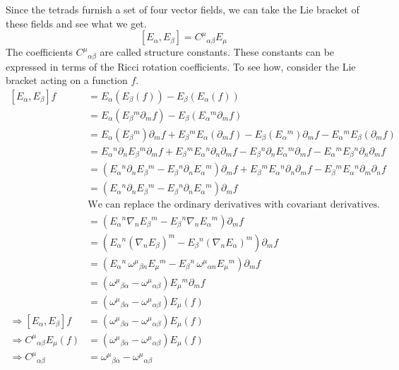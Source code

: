 Since the tetrads furnish a set of four vector fields, we can take the Lie bracket of these fields and see what we get.
\[
\left[ E_\alpha, E_\beta \right] = C^{\mu}{}_{\alpha\beta} E_\mu
\]
The coefficients $C^{\mu}{}_{\alpha\beta}$ are called structure constants. These constants can be expressed in terms of the Ricci rotation coefficients. To see how, consider the Lie bracket acting on a function $f$.
\begin{align*}
\left[ E_\alpha, E_\beta \right] f &= E_\alpha\left( E_\beta(f) \right) - E_\beta\left( E_\alpha(f) \right) \\
&= E_\alpha\left( E_\beta{}^m \partial_m f \right) - E_\beta\left( E_\alpha{}^m \partial_m f \right) \\
&= E_\alpha\left( E_\beta{}^m \right) \partial_m f + E_\beta{}^m E_\alpha\left( \partial_m f \right) - E_\beta\left( E_\alpha{}^m \right) \partial_m f - E_\alpha{}^m E_\beta\left( \partial_m f \right) \\
&= E_\alpha{}^n \partial_n E_\beta{}^m \partial_m f + E_\beta{}^m E_\alpha{}^n \partial_n \partial_m f - E_\beta{}^n \partial_n E_\alpha{}^m \partial_m f - E_\alpha{}^m E_\beta{}^n \partial_n \partial_m f \\
&= \left( E_\alpha{}^n \partial_n E_\beta{}^m - E_\beta{}^n \partial_n E_\alpha{}^m \right) \partial_m f + E_\beta{}^m E_\alpha{}^n \partial_n \partial_m f - E_\beta{}^m E_\alpha{}^n \partial_m \partial_n f \\
&= \left( E_\alpha{}^n \partial_n E_\beta{}^m - E_\beta{}^n \partial_n E_\alpha{}^m \right) \partial_m f \\
& \text{We can replace the ordinary derivatives with covariant derivatives.}\\
&= \left( E_\alpha{}^n \nabla_n E_\beta{}^m - E_\beta{}^n \nabla_n E_\alpha{}^m \right) \partial_m f \\
&= \left( E_\alpha{}^n \left( \nabla_n E_\beta \right)^m - E_\beta{}^n \left( \nabla_n E_\alpha \right)^m \right) \partial_m f \\
&= \left( E_\alpha{}^n\, \omega^{\mu}{}_{\beta n} E_\mu{}^m - E_\beta{}^n\, \omega^{\mu}{}_{\alpha n} E_\mu{}^m \right) \partial_m f \\
&= \left( \omega^{\mu}{}_{\beta\alpha} - \omega^{\mu}{}_{\alpha\beta} \right) E_\mu{}^m \partial_m f \\
&= \left( \omega^{\mu}{}_{\beta\alpha} - \omega^{\mu}{}_{\alpha\beta} \right) E_\mu(f) \\
\Rightarrow \left[ E_\alpha, E_\beta \right] f &= \left( \omega^{\mu}{}_{\beta\alpha} - \omega^{\mu}{}_{\alpha\beta} \right) E_\mu(f) \\
\Rightarrow C^{\mu}{}_{\alpha\beta} E_\mu(f) &= \left( \omega^{\mu}{}_{\beta\alpha} - \omega^{\mu}{}_{\alpha\beta} \right) E_\mu(f) \\
\Rightarrow C^{\mu}{}_{\alpha\beta} &= \omega^{\mu}{}_{\beta\alpha} - \omega^{\mu}{}_{\alpha\beta}
\end{align*}






